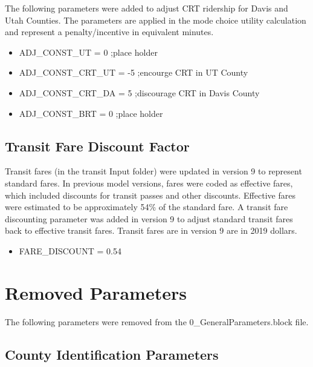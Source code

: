 \documentclass[
  letterpaper,
  DIV=11,
  numbers=noendperiod]{scrreprt}
\providecommand{\tightlist}{%
  \setlength{\itemsep}{0pt}\setlength{\parskip}{0pt}}\usepackage{longtable,booktabs,array}
\begin{document}
The following parameters were added to adjust CRT ridership for Davis
and Utah Counties. The parameters are applied in the mode choice utility
calculation and represent a penalty/incentive in equivalent minutes.

\begin{itemize}
\tightlist
\item
  ADJ\_CONST\_UT = 0 ;place holder
\item
  ADJ\_CONST\_CRT\_UT = -5 ;encourge CRT in UT County
\item
  ADJ\_CONST\_CRT\_DA = 5 ;discourage CRT in Davis County
\item
  ADJ\_CONST\_BRT = 0 ;place holder
\end{itemize}

\hypertarget{transit-fare-discount-factor}{%
\subsection{Transit Fare Discount
Factor}\label{transit-fare-discount-factor}}

Transit fares (in the transit Input folder) were updated in version 9 to
represent standard fares. In previous model versions, fares were coded
as effective fares, which included discounts for transit passes and
other discounts. Effective fares were estimated to be approximately 54\%
of the standard fare. A transit fare discounting parameter was added in
version 9 to adjust standard transit fares back to effective transit
fares. Transit fares are in version 9 are in 2019 dollars.

\begin{itemize}
\tightlist
\item
  FARE\_DISCOUNT = 0.54
\end{itemize}

\hypertarget{removed-parameters}{%
\section{Removed Parameters}\label{removed-parameters}}

The following parameters were removed from the
0\_GeneralParameters.block file.

\hypertarget{county-identification-parameters}{%
\subsection{County Identification
Parameters}\label{county-identification-parameters}}
\end{document}
